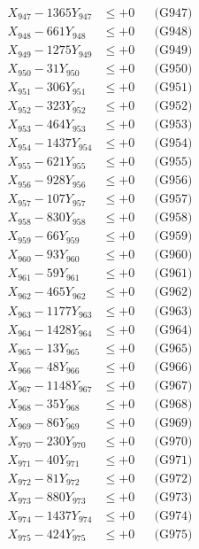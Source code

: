 \documentclass[a4paper,10pt]{article}
\begin{document}
{\begin{align}
X_{947} - 1365Y_{947} &\leq +0 && \text{(G947)} \\
X_{948} - 661Y_{948} &\leq +0 && \text{(G948)} \\
X_{949} - 1275Y_{949} &\leq +0 && \text{(G949)} \\
X_{950} - 31Y_{950} &\leq +0 && \text{(G950)} \\
\allowbreak
X_{951} - 306Y_{951} &\leq +0 && \text{(G951)} \\
X_{952} - 323Y_{952} &\leq +0 && \text{(G952)} \\
X_{953} - 464Y_{953} &\leq +0 && \text{(G953)} \\
X_{954} - 1437Y_{954} &\leq +0 && \text{(G954)} \\
X_{955} - 621Y_{955} &\leq +0 && \text{(G955)} \\
X_{956} - 928Y_{956} &\leq +0 && \text{(G956)} \\
X_{957} - 107Y_{957} &\leq +0 && \text{(G957)} \\
X_{958} - 830Y_{958} &\leq +0 && \text{(G958)} \\
X_{959} - 66Y_{959} &\leq +0 && \text{(G959)} \\
X_{960} - 93Y_{960} &\leq +0 && \text{(G960)} \\
\allowbreak
X_{961} - 59Y_{961} &\leq +0 && \text{(G961)} \\
X_{962} - 465Y_{962} &\leq +0 && \text{(G962)} \\
X_{963} - 1177Y_{963} &\leq +0 && \text{(G963)} \\
X_{964} - 1428Y_{964} &\leq +0 && \text{(G964)} \\
X_{965} - 13Y_{965} &\leq +0 && \text{(G965)} \\
X_{966} - 48Y_{966} &\leq +0 && \text{(G966)} \\
X_{967} - 1148Y_{967} &\leq +0 && \text{(G967)} \\
X_{968} - 35Y_{968} &\leq +0 && \text{(G968)} \\
X_{969} - 86Y_{969} &\leq +0 && \text{(G969)} \\
X_{970} - 230Y_{970} &\leq +0 && \text{(G970)} \\
\allowbreak
X_{971} - 40Y_{971} &\leq +0 && \text{(G971)} \\
X_{972} - 81Y_{972} &\leq +0 && \text{(G972)} \\
X_{973} - 880Y_{973} &\leq +0 && \text{(G973)} \\
X_{974} - 1437Y_{974} &\leq +0 && \text{(G974)} \\
X_{975} - 424Y_{975} &\leq +0 && \text{(G975)} \\

\end{align}}
\end{document}
